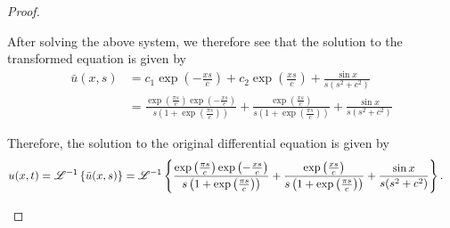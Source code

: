 \begin{proof}
\begin{enumerate}
      After solving the above system, we therefore see that the solution to the transformed equation is given by
      \begin{align*}
        \bar{u}(x, s) &= c_1 \exp{\left(-\frac{xs}{c}\right)} + c_2 \exp{\left(\frac{xs}{c}\right)} + \frac{\sin x}{s(s^2+c^2)} \\
        &= \frac{\exp{\left(\frac{\pi s}{c}\right)}\exp{\left(-\frac{xs}{c}\right)}}{s\left(1+\exp{\left(\frac{\pi s}{c}\right)}\right)} + \frac{\exp{\left(\frac{xs}{c}\right)}}{s\left(1+\exp{\left(\frac{\pi s}{c}\right)}\right)} + \frac{\sin x}{s(s^2+c^2)}
      \end{align*}

      Therefore, the solution to the original differential equation is given by
      \begin{align*}
        u(x, t) = \mathscr{L}^{-1}\left\{ {\bar{u}(x, s)} \right\}
        &= \mathscr{L}^{-1}\left\{ {\frac{\exp{\left(\frac{\pi s}{c}\right)}\exp{\left(-\frac{xs}{c}\right)}}{s\left(1+\exp{\left(\frac{\pi s}{c}\right)}\right)} + \frac{\exp{\left(\frac{xs}{c}\right)}}{s\left(1+\exp{\left(\frac{\pi s}{c}\right)}\right)} + \frac{\sin x}{s(s^2+c^2)}} \right\}.
      \end{align*}


  \end{enumerate}
\end{proof}
\newpage
